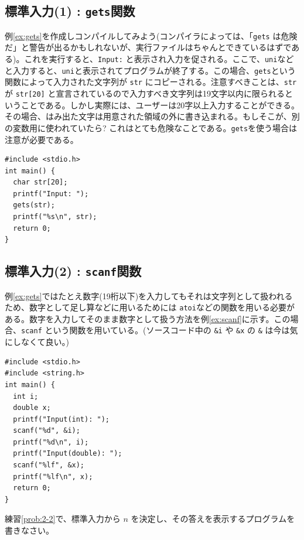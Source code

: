 \subsection{標準入力(1) : {\tt gets}関数}
例\ref{ex:gets}を作成しコンパイルしてみよう(コンパイラによっては、「\verb|gets| は危険だ」と警告が出るかもしれないが、実行ファイルはちゃんとできているはずである)。これを実行すると、\verb|Input:| と表示され入力を促される。ここで、\verb|uni|などと入力すると、\verb|uni|と表示されてプログラムが終了する。この場合、\verb|gets|という関数によって入力された文字列が \verb|str| にコピーされる。注意すべきことは、\verb|str| が \verb|str[20]| と宣言されているので入力すべき文字列は19文字以内に限られるということである。しかし実際には、ユーザーは20字以上入力することができる。その場合、はみ出た文字は用意された領域の外に書き込まれる。もしそこが、別の変数用に使われていたら? これはとても危険なことである。\verb|gets|を使う場合は注意が必要である。
\begin{reidai}\label{ex:gets}
\begin{verbatim}
#include <stdio.h>
int main() {
  char str[20];
  printf("Input: ");
  gets(str);
  printf("%s\n", str);
  return 0;
}
\end{verbatim}
\end{reidai}

\subsection{標準入力(2) : {\tt scanf}関数}
例\ref{ex:gets}ではたとえ数字(19桁以下)を入力してもそれは文字列として扱われるため、数字として足し算などに用いるためには \verb|atoi|などの関数を用いる必要がある。数字を入力してそのまま数字として扱う方法を例\ref{ex:scanf}に示す。この場合、\verb|scanf| という関数を用いている。(ソースコード中の \verb|&i| や \verb|&x| の \verb|&| は今は気にしなくて良い。)
\begin{reidai}\label{ex:scanf}
\begin{verbatim}
#include <stdio.h>
#include <string.h>
int main() {
  int i;
  double x;
  printf("Input(int): ");
  scanf("%d", &i);
  printf("%d\n", i);
  printf("Input(double): ");
  scanf("%lf", &x);
  printf("%lf\n", x);
  return 0;
}
\end{verbatim}
\end{reidai}

\begin{renshuu}\label{prob:4-1}
練習\ref{prob:2-2}で、標準入力から $n$ を決定し、その答えを表示するプログラムを書きなさい。
\end{renshuu}

